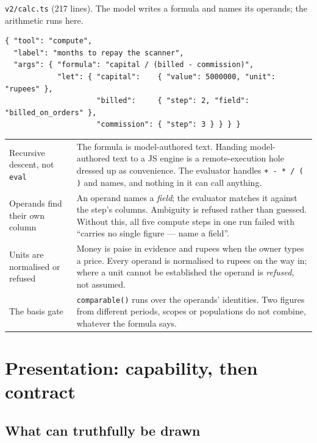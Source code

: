 \documentclass[11pt,a4paper]{report}
\newcommand{\file}[1]{\texttt{\small #1}}
\newcommand{\code}[1]{\texttt{\small #1}}
\begin{document}
\file{v2/calc.ts} (217 lines). The model writes a formula and names its operands; the arithmetic
runs here.

\begin{lstlisting}
{ "tool": "compute",
  "label": "months to repay the scanner",
  "args": { "formula": "capital / (billed - commission)",
            "let": { "capital":    { "value": 5000000, "unit": "rupees" },
                     "billed":     { "step": 2, "field": "billed_on_orders" },
                     "commission": { "step": 3 } } } }
\end{lstlisting}

\begin{center}
\small
\begin{tabular}{@{}p{3.6cm}p{11.2cm}@{}}
\toprule
Recursive descent, not \code{eval} & The formula is model-authored text. Handing model-authored
 text to a JS engine is a remote-execution hole dressed up as convenience. The evaluator handles
 \code{+ - * / ( )} and names, and nothing in it can call anything.\\[2pt]
Operands find their own column & An operand names a \emph{field}; the evaluator matches it against
 the step's columns. Ambiguity is refused rather than guessed. Without this, all five compute steps
 in one run failed with ``carries no single figure --- name a field''.\\[2pt]
Units are normalised or refused & Money is paise in evidence and rupees when the owner types a
 price. Every operand is normalised to rupees on the way in; where a unit cannot be established the
 operand is \emph{refused}, not assumed.\\[2pt]
The basis gate & \code{comparable()} runs over the operands' identities. Two figures from different
 periods, scopes or populations do not combine, whatever the formula says.\\
\bottomrule
\end{tabular}
\end{center}

\section{Presentation: capability, then contract}

\subsection{What can truthfully be drawn}
\end{document}
